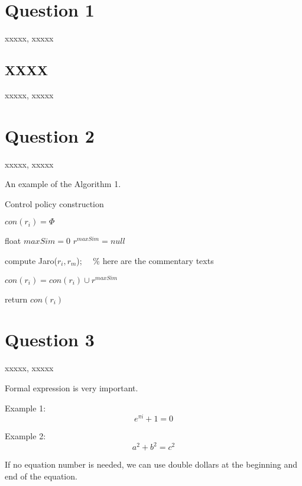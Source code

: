 \documentclass{must-assignment}
\begin{document}
\maketitle
\setlength{\parindent}{2em}
\section{Question 1}
xxxxx, xxxxx \cite{1}
\subsection{XXXX}
xxxxx, xxxxx \cite{2,3,4}

\section{Question 2}
xxxxx, xxxxx

An example of the Algorithm 1.


\begin{algorithm} 
	\SetAlgoVlined 
	\caption{Control policy construction} 
	$con(r_i)= \Phi$\; 
	{ 
		float $maxSim=0$\; 
		$r^{maxSim}=null$\; 
		{ 
			compute Jaro($r_i,r_m$);~~ \% here are the commentary texts 

		} 
		$con(r_i)=con(r_i)\cup {r^{maxSim}}$\; 
	} 
	return $con(r_i)$\; 
\end{algorithm}

\section{Question 3}
xxxxx, xxxxx

Formal expression is very important.

Example 1:
\begin{equation}
\label{eq1}
	e^{\pi i}+1=0
\end{equation}

Example 2:
\begin{equation}
\label{eq2}
	a^2+b^2=c^2
\end{equation}

If no equation number is needed, we can use double dollars at the beginning and end of the equation.
\end{document}
